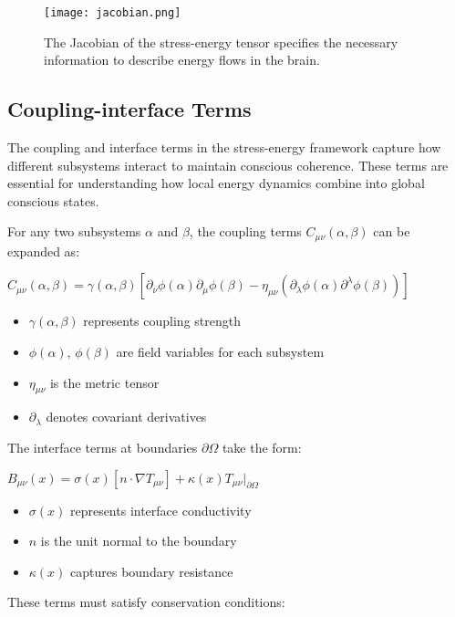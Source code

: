 \begin{refsection}
\begin{figure}[h]
    \centering
    \texttt{[image: jacobian.png]}

    \caption{The Jacobian of the stress-energy tensor specifies the necessary information to describe energy flows in the brain.}
\end{figure}

\subsection{Coupling-interface Terms}

The coupling and interface terms in the stress-energy framework capture how different subsystems interact to maintain conscious coherence. These terms are essential for understanding how local energy dynamics combine into global conscious states.

For any two subsystems $\alpha$ and $\beta$, the coupling terms $C_{\mu\nu}(\alpha,\beta)$ can be expanded as:

$C_{\mu\nu}(\alpha,\beta) = \gamma(\alpha,\beta)[\partial_\nu\phi(\alpha)\partial_\mu\phi(\beta) - \eta_{\mu\nu}(\partial_\lambda\phi(\alpha)\partial^\lambda\phi(\beta))]$

\begin{itemize}
\item $\gamma(\alpha,\beta)$ represents coupling strength
\item $\phi(\alpha)$, $\phi(\beta)$ are field variables for each subsystem
\item $\eta_{\mu\nu}$ is the metric tensor
\item $\partial_\lambda$ denotes covariant derivatives
\end{itemize}

The interface terms at boundaries $\partial \Omega$ take the form:

$B_{\mu\nu}(x) = \sigma(x)[n \cdot \nabla T_{\mu\nu}] + \kappa(x)T_{\mu\nu}|_{\partial\Omega}$

\begin{itemize}
\item $\sigma(x)$ represents interface conductivity
\item $n$ is the unit normal to the boundary
\item $\kappa(x)$ captures boundary resistance
\end{itemize}

These terms must satisfy conservation conditions:


\end{refsection}
